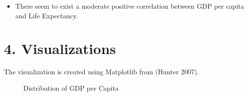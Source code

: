 \documentclass[
  letterpaper,
  DIV=11,
  numbers=noendperiod]{scrartcl}
\providecommand{\tightlist}{%
  \setlength{\itemsep}{0pt}\setlength{\parskip}{0pt}}\usepackage{longtable,booktabs,array}
\begin{document}
\begin{itemize}
\tightlist
\item
  There seem to exist a moderate positive correlation between GDP per
  capita and Life Expectancy.
\end{itemize}

\section{4. Visualizations}\label{visualizations}

The visualization is created using Matplotlib from (Hunter 2007).

\begin{figure}


\caption{\label{fig-gdp}Distribution of GDP per Capita}

\end{figure}%
\end{document}
